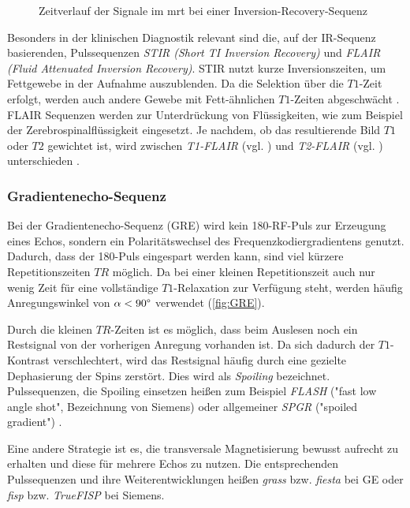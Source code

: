 \begin{figure}[H]
	\centering
	\caption[Inversion-Recovery-Sequenz]{Zeitverlauf der Signale im \gls{mrt} bei einer Inversion-Recovery-Sequenz}
	\label{fig:IR}
\end{figure}

Besonders in der klinischen Diagnostik relevant sind die, auf der IR-Sequenz basierenden, Pulssequenzen \textit{STIR (Short TI Inversion Recovery)} und \textit{FLAIR (Fluid Attenuated Inversion Recovery)}.
STIR nutzt kurze Inversionszeiten, um Fettgewebe in der Aufnahme auszublenden. Da die Selektion über die $T1$-Zeit erfolgt, werden auch andere Gewebe mit Fett-ähnlichen $T1$-Zeiten abgeschwächt \cite{Bydder1985}.
FLAIR Sequenzen werden zur Unterdrückung von Flüssigkeiten, wie zum Beispiel der Zerebrospinalflüssigkeit eingesetzt. Je nachdem, ob das resultierende Bild $T1$ oder $T2$ gewichtet ist, wird zwischen \textit{T1-FLAIR} (vgl. \cite{Melhem1997}) und \textit{T2-FLAIR} (vgl. \cite{Hajnal1992}) unterschieden \cite{Bakshi2001}.

\subsubsection{Gradientenecho-Sequenz}
\label{sec:GRE}
Bei der Gradientenecho-Sequenz (GRE) wird kein 180\degree-RF-Puls zur Erzeugung eines Echos, sondern ein Polaritätswechsel des Frequenzkodiergradientens genutzt. Dadurch, dass der 180\degree-Puls eingespart werden kann, sind viel kürzere Repetitionszeiten $TR$ möglich. Da bei einer kleinen Repetitionszeit auch nur wenig Zeit für eine vollständige $T1$-Relaxation zur Verfügung steht, werden häufig Anregungswinkel von $\alpha<90\degree$ verwendet (\autoref{fig:GRE}).

Durch die kleinen $TR$-Zeiten ist es möglich, dass beim Auslesen noch ein Restsignal von der vorherigen Anregung vorhanden ist. Da sich dadurch der $T1$-Kontrast verschlechtert, wird das Restsignal häufig durch eine gezielte Dephasierung der Spins zerstört. Dies wird als \textit{Spoiling} bezeichnet. Pulssequenzen, die Spoiling einsetzen heißen zum Beispiel \textit{FLASH} ("fast low angle shot", Bezeichnung von Siemens) oder allgemeiner \textit{SPGR} ("spoiled gradient") \cite[S.~287]{Bushong2014}.

Eine andere Strategie ist es, die transversale Magnetisierung bewusst aufrecht zu erhalten und diese für mehrere Echos zu nutzen. Die entsprechenden Pulssequenzen und ihre Weiterentwicklungen heißen \textit{\gls{grass}} bzw. \textit{\gls{fiesta}} bei GE oder \textit{\gls{fisp}} bzw. \textit{TrueFISP} bei Siemens.

